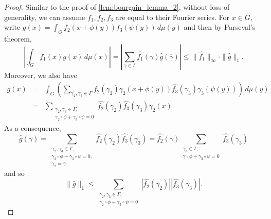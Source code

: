 \documentclass[10pt]{article}
\theoremstyle{definition}
\begin{document}
\begin{proof}

Similar to the proof of \cref{lem:bourgain_lemma_2}, without loss of generality, we can assume $f_1, f_2, f_3$ are equal to their Fourier series. For $x \in G$, write $g(x) = \int_{G} f_2(x+ \phi(y) )f_3(\psi(y) ) \, d\mu(y)$ and then by Parseval's theorem,
\begin{equation*} %
\left| \int_G f_1(x) g(x) \, d \mu(x) \right|= \left| \sum_{\gamma \in \Gamma} \widehat{f_1}(\gamma) \widehat{g} (\overline{\gamma}) \right| \leq \| \widehat{f_1} \|_{\infty} \cdot \| \widehat{g} \|_{1}.
\end{equation*} 
Moreover, we also have
\begin{eqnarray*}
g(x) %
&=& \int_G \left( \sum_{\gamma_2, \gamma_3 \in \Gamma} \widehat{f_2}(\gamma_2) \gamma_2(x+ \phi(y)) \widehat{f_3}(\gamma_3) \gamma_3(\psi(y)) \right) \, d\mu(y) \nonumber \\
&=&  \sum_{\substack{ \gamma_2, \gamma_3 \in \Gamma,\\ \gamma_2 \circ \phi + \gamma_3 \circ \psi = 0}} \widehat{f_2}(\gamma_2) \widehat{f_3}(\gamma_3) \gamma_2(x). %
\end{eqnarray*}
As a consequence,
\begin{equation*} %
\widehat{g}(\gamma) = \sum_{\substack{ \gamma_2, \gamma_3 \in \Gamma,\\ \gamma_2 \circ \phi + \gamma_3 \circ \psi = 0, \\ \gamma_2 = \gamma}} 
\widehat{f_2}(\gamma_2) \widehat{f_3}(\gamma_3) =
\widehat{f_2}(\gamma) \sum_{\substack{\gamma_3 \in \Gamma, \\ \gamma \circ \phi + \gamma_3 \circ \psi = 0}}  \widehat{f_3}(\gamma_3)
\end{equation*}
and so
\begin{equation*} %
\| \widehat{g} \|_{1} \leq \sum_{\substack{\gamma_2, \gamma_3 \in \Gamma, \\ \gamma_2 \circ \phi + \gamma_3 \circ \psi = 0}} \left| \widehat{f_2}(\gamma_2) \right| \left| \widehat{f_3}(\gamma_3) \right|.

\end{equation*}
\end{proof}
\end{document}
